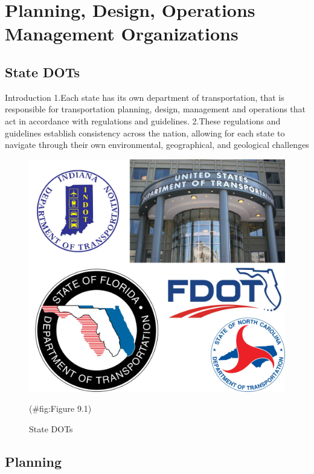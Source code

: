 \documentclass[
]{book}
\begin{document}
\hypertarget{planning}{%
\chapter{Planning, Design, Operations Management Organizations}\label{planning}}

\hypertarget{planning-DOT}{%
\section{State DOTs}\label{planning-DOT}}

Introduction
1.Each state has its own department of transportation, that is responsible for transportation planning, design, management and operations that act in accordance with regulations and guidelines.
2.These regulations and guidelines establish consistency across the nation, allowing for each state to navigate through their own environmental, geographical, and geological challenges

\begin{figure}

{\centering \includegraphics{./Images/planning design/State DOTs} 

}

\caption{State DOTs}(\#fig:Figure 9.1)
\end{figure}

\hypertarget{planning-plan}{%
\section{Planning}\label{planning-plan}}
\end{document}
